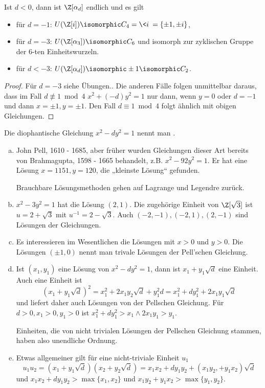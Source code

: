 \begin{st} \label{4.17}
	Ist $d < 0$, dann ist $\Z[\alpha_d]$ endlich und es gilt
	\begin{itemize}
		\item
			für $d = -1$: $U(\Z[i]) \isomorphic C_4 = \<i\> = \{ \pm 1, \pm i \}$,
		\item
			für $d = -3$: $U(\Z[\alpha_3]) \isomorphic C_6$ und isomorph zur zyklischen Gruppe der $6$-ten Einheitswurzeln.
		\item
			für $d < -3$: $U(\Z[\alpha_d]) \isomorphic \pm 1 \isomorphic C_2$.
	\end{itemize}
	\begin{proof}
		Für $d = -3$ siehe Übungen..
		Die anderen Fälle folgen unmittelbar daraus, dass im Fall $d \not\equiv 1 \bmod 4$ $x^2 + (-d) y^2 = 1$ nur dann, wenn $y = 0$ oder $d = -1$ und dann $x = \pm 1, y = \pm 1$.
		Den Fall $d \equiv 1 \bmod 4$ folgt ähnlich mit obigen Gleichungen.
	\end{proof}
\end{st}

\begin{df} \label{4.18}
	Die diophantische Gleichung $x^2 - dy^2 = 1$ nennt man .
\end{df}

\begin{nt}
	\begin{enumerate}[a)]
		\item
			John Pell, 1610 - 1685, aber früher wurden Gleichungen dieser Art bereits von Brahmagupta, 1598 - 1665 behandelt, z.B. $x^2 - 92 y^2 = 1$.
			Er hat eine Lösung $x = 1151, y = 120$, die „kleinste Lösung“ gefunden.

			Brauchbare Lösungsmethoden gehen auf Lagrange und Legendre zurück.
		\item
			$x^2 - 3y^2 = 1$ hat die Lösung $(2,1)$.
			Die zugehörige Einheit von $\Z[\sqrt 3]$ ist $u = 2 + \sqrt 3$ mit $u^{-1} = 2 - \sqrt 3$.
			Auch $(-2, -1), (-2, 1), (2, -1)$ sind Lösungen der Gleichungen.
		\item
			Es interessieren im Wesentlichen die Lösungen mit $x > 0$ und $y > 0$.
			Die Lösungen $(\pm 1, 0)$ nennt man trivale Lösungen der Pell'schen Gleichung.
		\item
			Ist $(x_1, y_1)$ eine Lösung von $x^2 - dy^2 = 1$, dann ist $x_1 + y_1 \sqrt d$ eine Einheit.
			Auch eine Einheit ist
			\[
				(x_1 + y_1 \sqrt d)^2
				= x_1^2 + 2x_1 y_2 \sqrt d + y_1^2 d
				= x_1^2 + dy_1^2 + 2x_1 y_1 \sqrt d
			\]
			und liefert daher auch Lösungen von der Pellschen Gleichung.
			Für $d > 0, x_1 > 0, y_1 > 0$ ist $x_1^2 + dy_1^2 > x_1 \land 2x_1y_1 > y_1$.

			Einheiten, die von nicht trivialen Lösungen der Pellschen Gleichung stammen, haben also unendliche Ordnung.
		\item
			Etwas allgemeiner gilt für eine nicht-triviale Einheit $u_1$
			\[
				u_1 u_2 = (x_1 + y_1 \sqrt d)(x_2 + y_2 \sqrt d)
				= x_1 x_2 + dy_1 y_2 + (x_1 y_2, + y_1 x_2) \sqrt d
			\]
			und $x_1 x_2 + dy_1y_2 > \max\{x_1, x_2\}$ und $x_1y_2 + y_1 x_2 > \max \{y_1, y_2\}$.
	\end{enumerate}
\end{nt}

